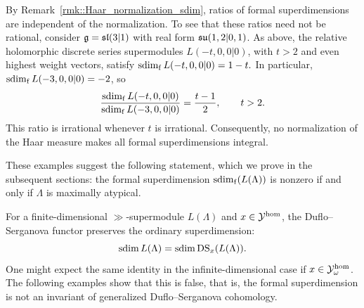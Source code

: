 \begin{remark}
By Remark~\ref{rmk::Haar_normalization_sdim}, ratios of formal superdimensions are independent of the normalization. To see that these ratios need not be rational, consider $\gg=\sl(3\vert1)$ with real form $\su(1,2\vert0,1)$. As above, the relative holomorphic discrete series supermodules $L(-t,0,0\vert0)$, with $t>2$ and even highest weight vectors, satisfy
$
\fsdim L(-t,0,0\vert0)=1-t.
$
In particular, $\fsdim L(-3,0,0\vert0)=-2$, so
\[
\frac{\fsdim L(-t,0,0\vert0)}
     {\fsdim L(-3,0,0\vert0)}
=
\frac{t-1}{2},
\qquad t>2.
\]
This ratio is irrational whenever $t$ is irrational. Consequently, no normalization of the Haar measure makes all formal superdimensions integral.
\end{remark}




These examples suggest the following statement, which we prove in the subsequent sections: the formal superdimension $\fsdim(L(\Lambda))$ is nonzero if and only if $\Lambda$ is maximally atypical.


For a finite-dimensional $\gg$-supermodule $L(\Lambda)$ and $x\in\YY^{\hom}$, the Duflo--Serganova functor preserves the ordinary superdimension:
\begin{equation}
\sdim L(\Lambda)=\sdim\DS_x(L(\Lambda)).
\end{equation}
One might expect the same identity in the infinite-dimensional case if $x \in \YY^{\hom}_{\omega}$. The following examples show that this is false, that is, the formal superdimension is not an invariant of generalized Duflo--Serganova cohomology. 

